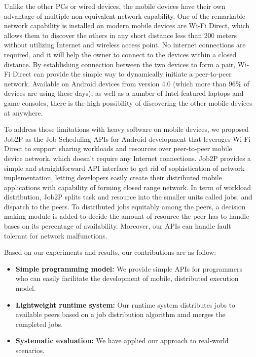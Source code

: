 \documentclass[conference]{IEEEtran}
\begin{document}
Unlike the other PCs or wired devices, the mobile devices have their own advantage of multiple non-equivalent network capability. One of the remarkable network capability is installed on modern mobile devices are Wi-Fi Direct, which allows them to discover the others in any short distance less than 200 meters without utilizing Internet and wireless access point. No internet connections are required, and it will help the owner to connect to the devices within a closed distance. By establishing connection between the two devices to form a pair, Wi-Fi Direct can provide the simple way to dynamically initiate a peer-to-peer network. Available on Android devices from version 4.0 (which more than 96\% of devices are using these days), as well as a number of Intel-featured laptops and game consoles, there is the high possibility of discovering the other mobile devices at anywhere.

To address those limitations with heavy software on mobile devices, we proposed Job2P as the Job Scheduling APIs for Android development that leverages Wi-Fi Direct to support sharing workloads and resources over peer-to-peer mobile device network, which doesn't require any Internet connections. Job2P provides a simple and straightforward API interface to get rid of sophistication of network implementation, letting developers easily create their distributed mobile applications with capability of forming closed range network. In term of workload distribution, Job2P splits task and resource into the smaller units called jobs, and dispatch to the peers. To distributed jobs equitably among the peers, a decision making module is added to decide the amount of resource the peer has to handle bases on its percentage of availability. Moreover, our APIs can handle fault tolerant for network malfunctions.

Based on our experiments and results, our contributions are as follow:
\begin{itemize}
	\item \textbf{Simple programming model:} We provide simple APIs for programmers who can easily facilitate the development of mobile, distributed execution model.
	\item \textbf{Lightweight runtime system:} Our runtime system distributes jobs to available peers based on a job distribution algorithm amd merges the completed jobs. 
	\item \textbf{Systematic evaluation:} We have applied our approach to real-world scenarios.
\end{itemize}
\end{document}
